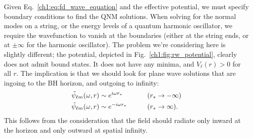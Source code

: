 Given Eq.~\ref{ch1:eq:fd_wave_equation} and the effective potential, we must specify boundary conditions to find the QNM solutions.
When solving for the normal modes on a string, or the energy levels of a quantum harmonic oscillator, we require the wavefunction to vanish at the boundaries (either at the string ends, or at $\pm \infty$ for the harmonic oscillator).
The problem we're considering here is slightly different; the potential, depicted in Fig.~\ref{ch1:fig:rw_potential}, clearly does not admit bound states. 
It does not have any minima, and $V_\ell(r) > 0$ for all $r$.
The implication is that we should look for plane wave solutions that are ingoing to the BH horizon, and outgoing to infinity:
\begin{alignat}{2}
    &\tilde{\psi}_{\ell m}(\omega, r) \sim e^{i \omega r_*} \qquad &&\qty(r_* \rightarrow -\infty) \nonumber \\
    &\tilde{\psi}_{\ell m}(\omega, r) \sim e^{- i \omega r_*} \qquad &&\qty(r_* \rightarrow \infty).
\end{alignat}
This follows from the consideration that the field should radiate only inward at the horizon and only outward at spatial infinity.

